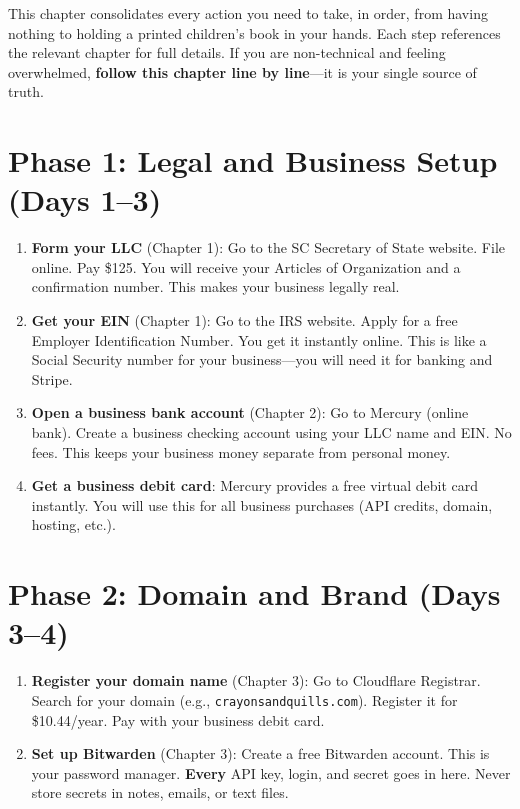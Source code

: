 \documentclass[12pt, letterpaper, oneside]{book}
\begin{document}
This chapter consolidates every action you need to take, in order, from having nothing to holding a printed children's book in your hands. Each step references the relevant chapter for full details. If you are non-technical and feeling overwhelmed, \textbf{follow this chapter line by line}---it is your single source of truth.

\section{Phase 1: Legal and Business Setup (Days 1--3)}

\begin{enumerate}[leftmargin=2em, itemsep=6pt]
  \item \textbf{Form your LLC} (Chapter 1): Go to the SC Secretary of State website. File online. Pay \$125. You will receive your Articles of Organization and a confirmation number. This makes your business legally real.

  \item \textbf{Get your EIN} (Chapter 1): Go to the IRS website. Apply for a free Employer Identification Number. You get it instantly online. This is like a Social Security number for your business---you will need it for banking and Stripe.

  \item \textbf{Open a business bank account} (Chapter 2): Go to Mercury (online bank). Create a business checking account using your LLC name and EIN. No fees. This keeps your business money separate from personal money.

  \item \textbf{Get a business debit card}: Mercury provides a free virtual debit card instantly. You will use this for all business purchases (API credits, domain, hosting, etc.).
\end{enumerate}

\section{Phase 2: Domain and Brand (Days 3--4)}

\begin{enumerate}[leftmargin=2em, itemsep=6pt, start=5]
  \item \textbf{Register your domain name} (Chapter 3): Go to Cloudflare Registrar. Search for your domain (e.g., \texttt{crayonsandquills.com}). Register it for \$10.44/year. Pay with your business debit card.

  \item \textbf{Set up Bitwarden} (Chapter 3): Create a free Bitwarden account. This is your password manager. \textbf{Every} API key, login, and secret goes in here. Never store secrets in notes, emails, or text files.
\end{enumerate}
\end{document}
